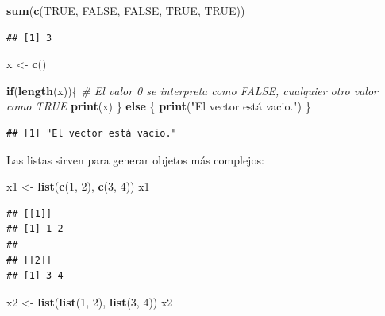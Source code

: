 \documentclass[]{book}
\newenvironment{Shaded}{\begin{snugshade}}{\end{snugshade}}
\newcommand{\KeywordTok}[1]{\textcolor[rgb]{0.13,0.29,0.53}{\textbf{#1}}}
\newcommand{\DecValTok}[1]{\textcolor[rgb]{0.00,0.00,0.81}{#1}}
\newcommand{\StringTok}[1]{\textcolor[rgb]{0.31,0.60,0.02}{#1}}
\newcommand{\CommentTok}[1]{\textcolor[rgb]{0.56,0.35,0.01}{\textit{#1}}}
\newcommand{\OtherTok}[1]{\textcolor[rgb]{0.56,0.35,0.01}{#1}}
\newcommand{\ControlFlowTok}[1]{\textcolor[rgb]{0.13,0.29,0.53}{\textbf{#1}}}
\newcommand{\NormalTok}[1]{#1}
\theoremstyle{definition}
\theoremstyle{definition}
\theoremstyle{definition}
\theoremstyle{remark}
\begin{document}
\begin{Shaded}
\begin{Highlighting}[]
\KeywordTok{sum}\NormalTok{(}\KeywordTok{c}\NormalTok{(}\OtherTok{TRUE}\NormalTok{, }\OtherTok{FALSE}\NormalTok{, }\OtherTok{FALSE}\NormalTok{, }\OtherTok{TRUE}\NormalTok{, }\OtherTok{TRUE}\NormalTok{))}
\end{Highlighting}
\end{Shaded}

\begin{verbatim}
## [1] 3
\end{verbatim}

\begin{Shaded}
\begin{Highlighting}[]
\NormalTok{x <-}\StringTok{ }\KeywordTok{c}\NormalTok{()}

\ControlFlowTok{if}\NormalTok{(}\KeywordTok{length}\NormalTok{(x))\{ }\CommentTok{# El valor 0 se interpreta como FALSE, cualquier otro valor como TRUE}
  \KeywordTok{print}\NormalTok{(x)}
\NormalTok{\} }\ControlFlowTok{else}\NormalTok{ \{}
  \KeywordTok{print}\NormalTok{(}\StringTok{"El vector está vacio."}\NormalTok{)}
\NormalTok{\}}
\end{Highlighting}
\end{Shaded}

\begin{verbatim}
## [1] "El vector está vacio."
\end{verbatim}

Las listas sirven para generar objetos más complejos:

\begin{Shaded}
\begin{Highlighting}[]
\NormalTok{x1 <-}\StringTok{ }\KeywordTok{list}\NormalTok{(}\KeywordTok{c}\NormalTok{(}\DecValTok{1}\NormalTok{, }\DecValTok{2}\NormalTok{), }\KeywordTok{c}\NormalTok{(}\DecValTok{3}\NormalTok{, }\DecValTok{4}\NormalTok{))}
\NormalTok{x1}
\end{Highlighting}
\end{Shaded}

\begin{verbatim}
## [[1]]
## [1] 1 2
## 
## [[2]]
## [1] 3 4
\end{verbatim}

\begin{Shaded}
\begin{Highlighting}[]
\NormalTok{x2 <-}\StringTok{ }\KeywordTok{list}\NormalTok{(}\KeywordTok{list}\NormalTok{(}\DecValTok{1}\NormalTok{, }\DecValTok{2}\NormalTok{), }\KeywordTok{list}\NormalTok{(}\DecValTok{3}\NormalTok{, }\DecValTok{4}\NormalTok{))}
\NormalTok{x2}
\end{Highlighting}
\end{Shaded}
\end{document}
